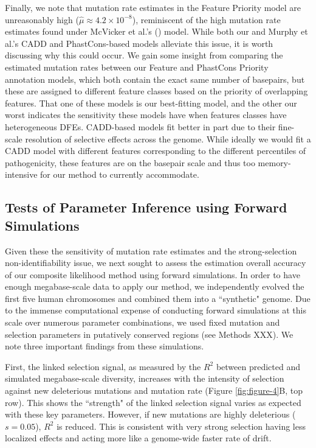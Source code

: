 \documentclass[11pt]{article}
\begin{document}
Finally, we note that mutation rate estimates in the Feature Priority model are
unreasonably high ($\widehat{\mu} \approx 4.2 \times 10^{-8}$), reminiscent of
the high mutation rate estimates found under McVicker et al.'s
(\citeyear{McVicker2009-ax}) model. While both our and Murphy et al.'s CADD and
PhastCons-based models alleviate this issue, it is worth discussing why this
could occur. We gain some insight from comparing the estimated mutation rates
between our Feature and PhastCons Priority annotation models, which both
contain the exact same number of basepairs, but these are assigned to different
feature classes based on the priority of overlapping features. That one of
these models is our best-fitting model, and the other our worst indicates the
sensitivity these models have when features classes have heterogeneous DFEs.
CADD-based models fit better in part due to their fine-scale resolution of
selective effects across the genome. While ideally we would fit a CADD model
with different features corresponding to the different percentiles of
pathogenicity, these features are on the basepair scale and thus too
memory-intensive for our method to currently accommodate.

\subsection*{Tests of Parameter Inference using Forward Simulations}

Given these the sensitivity of mutation rate estimates and the strong-selection
non-identifiability issue, we next sought to assess the estimation overall
accuracy of our composite likelihood method using forward simulations. In order
to have enough megabase-scale data to apply our method, we independently
evolved the first five human chromosomes and combined them into a ``synthetic"
genome. Due to the immense computational expense of conducting forward
simulations at this scale over numerous parameter combinations, we used fixed
mutation and selection parameters in putatively conserved regions (see Methods
XXX). We note three important findings from these simulations.

First, the linked selection signal, as measured by the $R^2$ between predicted
and simulated megabase-scale diversity, increases with the intensity of
selection against new deleterious mutations and mutation rate (Figure
\ref{fig:figure-4}B, top row). This shows the ``strength" of the linked
selection signal varies as expected with these key parameters. However, if new
mutations are highly deleterious ($s=0.05$), $R^2$ is reduced. This is
consistent with very strong selection having less localized effects and acting
more like a genome-wide faster rate of drift.
\end{document}
